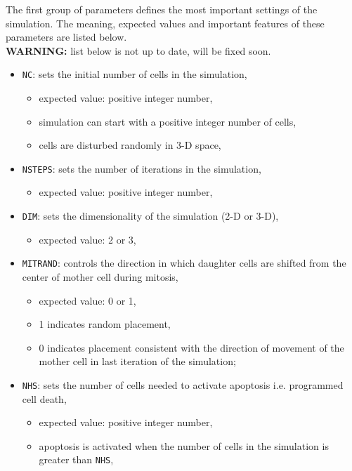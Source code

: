 \documentclass[10pt]{article}
\begin{document}
The first group of parameters defines the most important settings of the simulation. The meaning, expected values and important features of these parameters are listed below.\\

{\bf WARNING:} list below is not up to date, will be fixed soon.

\begin{itemize}
\item {\tt NC}: sets the initial number of cells in the simulation,
\begin{itemize}
\item expected value: positive integer number,
\item simulation can start with a positive integer number of cells, 
\item cells are disturbed randomly in 3-D space, 
\end{itemize}

\item {\tt NSTEPS}: sets the number of iterations in the simulation,
\begin{itemize}
\item expected value: positive integer number,
\end{itemize}

\item {\tt DIM}: sets the dimensionality of the simulation (2-D or 3-D),
\begin{itemize}
\item expected value: 2 or 3,
\end{itemize}

\item {\tt MITRAND}: controls the direction in which daughter cells are shifted from the center of mother cell during mitosis,
\begin{itemize}
\item expected value: 0 or 1,
\item 1 indicates random placement, 
\item 0 indicates placement consistent with the direction of movement of the mother cell in last iteration of the simulation; 
\end{itemize}

\item {\tt NHS}: sets the number of cells needed to activate apoptosis i.e. programmed cell death,
\begin{itemize}
\item expected value: positive integer number,
\item apoptosis is activated when the number of cells in the simulation is greater than {\tt NHS},
\end{itemize}


\end{itemize}
\end{document}
